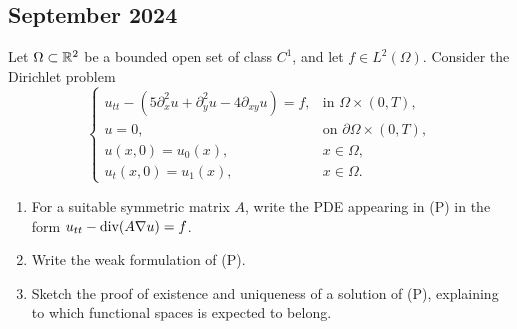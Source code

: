 \subsection{September 2024}
\begin{exercise}
    Let \(\Omega \subset \mathbb{R}^2\) be a bounded open set of class \(C^1\), and let \(f \in L^2(\Omega)\). Consider the Dirichlet problem
    \begin{equation*}
        \begin{cases}
            u_{tt} - \left(5\partial_x^2 u +  \partial_y^2 u - 4 \partial_{xy} u\right) = f, & \text{in } \Omega \times (0, T), \\
            u = 0, & \text{on } \partial \Omega \times (0, T), \\
            u(x,0) = u_0(x), & x \in \Omega, \\
            u_t(x,0) = u_1(x), & x \in \Omega.
        \end{cases}
        \tag{(P)}
    \end{equation*}
    \begin{enumerate}
        \item For a suitable symmetric matrix \(A\), write the PDE appearing in (P) in the form \(u_{tt} - \text{div}(A \nabla u) = f\).
        \item Write the weak formulation of (P).
        \item Sketch the proof of existence and uniqueness of a solution of (P), explaining to which functional spaces is expected to belong.
    \end{enumerate}
\end{exercise}
